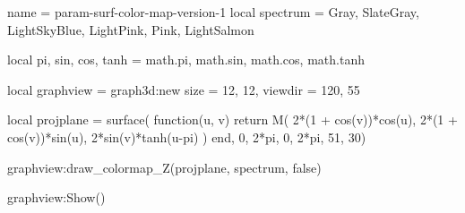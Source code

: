 \documentclass{standalone}
\begin{document}
\begin{luadraw}{name = param-surf-color-map-version-1}
local spectrum = {Gray, SlateGray, LightSkyBlue, LightPink, Pink, LightSalmon}

local pi, sin, cos, tanh = math.pi, math.sin, math.cos, math.tanh

local graphview = graph3d:new{
  size    = {12, 12},
  viewdir = {120, 55}
}

local projplane = surface(
  function(u, v)
    return M(
      2*(1 + cos(v))*cos(u),
      2*(1 + cos(v))*sin(u),
      2*sin(v)*tanh(u-pi)
    )
  end,
  0, 2*pi, 0,  2*pi,
  {51, 30})

graphview:draw_colormap_Z(projplane, spectrum, false)

graphview:Show()
\end{luadraw}
\end{document}
